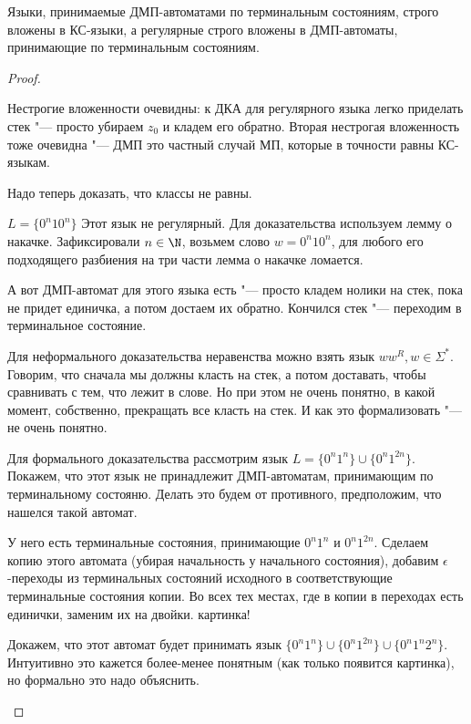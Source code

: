\begin{theorem}
Языки, принимаемые ДМП-автоматами по терминальным состояниям, строго вложены в КС-языки, а регулярные строго вложены в ДМП-автоматы, принимающие по терминальным состояниям.
\end{theorem}
\begin{proof}
    \begin{description}
Нестрогие вложенности очевидны: к ДКА для регулярного языка легко приделать стек "--- просто убираем $z_0$ и кладем его обратно.
Вторая нестрогая вложенность тоже очевидна "--- ДМП это частный случай МП, которые в точности равны КС-языкам.

Надо теперь доказать, что классы не равны.

\item[Регулярные $\neq$ ДМП-автоматам]

$L = \{0^n10^n\}$
Этот язык не регулярный. Для доказательства используем лемму о накачке. Зафиксировали $n \in \N$, возьмем слово $w = 0^n10^n$, для любого его подходящего разбиения на три части лемма о накачке ломается.

А вот ДМП-автомат для этого языка есть "--- просто кладем нолики на стек, пока не придет единичка, а потом достаем их обратно. 
Кончился стек "--- переходим в терминальное состояние.

\item[ДМП-автоматы $\neq$ КС-языки]

Для неформального доказательства неравенства можно взять язык $ww^R, w \in \Sigma^*$.
Говорим, что сначала мы должны класть на стек, а потом доставать, чтобы сравнивать с тем, что лежит в слове.
Но при этом не очень понятно, в какой момент, собственно, прекращать все класть на стек.
И как это формализовать "--- не очень понятно.

Для формального доказательства рассмотрим язык $L = \{0^n1^n\} \cup \{0^n 1^{2n}\}$.
Покажем, что этот язык не принадлежит ДМП-автоматам, принимающим по терминальному состояню.
Делать это будем от противного, предположим, что нашелся такой автомат.

У него есть терминальные состояния, принимающие $0^n1^n$ и $0^n1^{2n}$.
Сделаем копию этого автомата (убирая начальность у начального состояния), добавим $\epsilon$-переходы из терминальных состояний исходного в соответствующие терминальные состояния копии.
Во всех тех местах, где в копии в переходах есть единички, заменим их на двойки.
\TODO картинка!

Докажем, что этот автомат будет принимать язык $\{0^n1^n\} \cup \{0^n1^{2n}\} \cup \{0^n1^n2^n\}$.
Интуитивно это кажется более-менее понятным (как только появится картинка), но формально это надо объяснить.


\end{description}
\end{proof}
